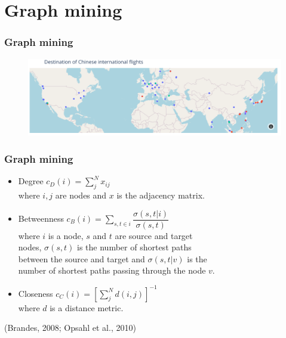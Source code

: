\documentclass{beamer}
\begin{document}
\section{Graph mining}
\begin{frame}
\frametitle{Graph mining}

\begin{figure}
\centering
\includegraphics[width=0.8\linewidth]{../visualizations/chinese_flights_screenshot.png}
\end{figure}

\end{frame}


\begin{frame}
\frametitle{Graph mining}

\begin{itemize}
  \item Degree \hspace{36px} $c_D (i) = \sum_j^N x_{ij}$ \\
    \hspace{72px} where $i, j$ are nodes and $x$ is the adjacency matrix.
  \vfill
  \item Betweenness \hspace{10px} $c_B (i) = \sum_{s, t \in i} \dfrac{\sigma (s, t | i)}{\sigma (s, t)}$ \\
    \hspace{72px} where $i$ is a node, $s$ and $t$ are source and target \\
    \hspace{72px} nodes, $\sigma (s, t)$ is the number of shortest paths \\
    \hspace{72px} between the source and target and $\sigma (s, t | v)$ is the \\
    \hspace{72px} number of shortest paths passing through the node $v$.
  \vfill
  \item Closeness \hspace{25px} $c_C(i) = \left[ \sum_j^N d(i, j) \right]^{-1}$ \\
    \hspace{72px} where $d$ is a distance metric.
\end{itemize}

\vfill

(Brandes, 2008; Opsahl et al., 2010)

\end{frame}
\end{document}
